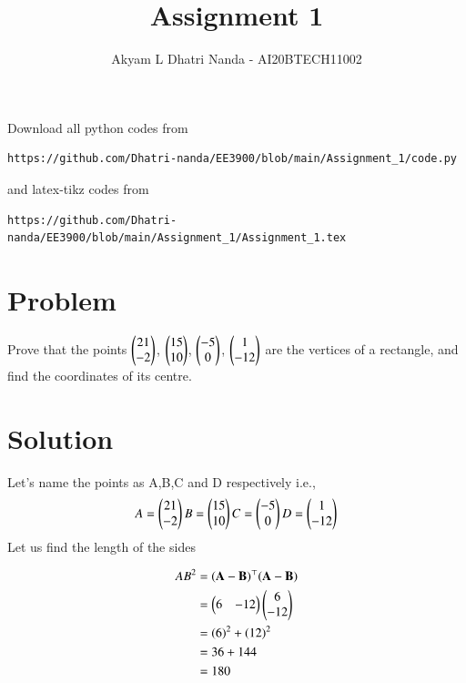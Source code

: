 \documentclass[journal,12pt,twocolumn]{IEEEtran}
\begin{document}
     \def\rightbox#1{\makebox[0in][r]{#1}}
     \def\centbox#1{\makebox[0in]{#1}}
     \def\topbox#1{\raisebox{-\baselineskip}[0in][0in]{#1}}
     \def\midbox#1{\raisebox{-0.5\baselineskip}[0in][0in]{#1}}
\vspace{3cm}
\title{Assignment 1}
\author{Akyam L Dhatri Nanda - AI20BTECH11002}
\maketitle
\newpage
\bigskip
\renewcommand{\thefigure}{\theenumi}
\renewcommand{\thetable}{\theenumi}
Download all python codes from 
\begin{lstlisting}
https://github.com/Dhatri-nanda/EE3900/blob/main/Assignment_1/code.py
\end{lstlisting}
%
and latex-tikz codes from 
%
\begin{lstlisting}
https://github.com/Dhatri-nanda/EE3900/blob/main/Assignment_1/Assignment_1.tex
\end{lstlisting}
\section{Problem}
Prove that the points $\begin{pmatrix}21\\-2\end{pmatrix}$, $\begin{pmatrix}15\\10\end{pmatrix}$, $\begin{pmatrix}-5\\0\end{pmatrix}$, $\begin{pmatrix}1\\-12\end{pmatrix}$ are the vertices of a rectangle, and find the coordinates of its centre.

\section{Solution}
Let's name the points as A,B,C and D respectively i.e.,
\begin{align}
A = \begin{pmatrix}21\\-2\end{pmatrix}
B = \begin{pmatrix}15\\10\end{pmatrix}
C = \begin{pmatrix}-5\\0\end{pmatrix}
D = \begin{pmatrix}1\\-12\end{pmatrix}
\end{align}
Let us find the length of the sides

\begin{align}
    AB^2 &= (\mathbf{\mathbf{A} - \mathbf{B}})^\top(\mathbf{\mathbf{A} - \mathbf{B}}) \\
    &=  \begin{pmatrix}6 & -12\end{pmatrix} \begin{pmatrix}6 \\ -12\end{pmatrix}\\
    &= (6)^{2}+ (12)^{2}\\
    &= 36 + 144\\
    &= 180
\end{align}
\end{document}
